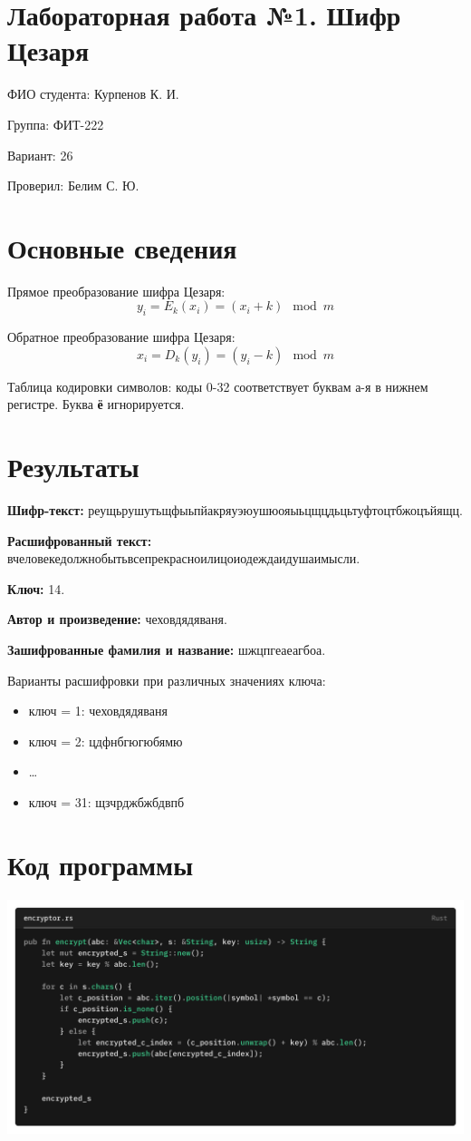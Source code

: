 \documentclass[a4paper]{report}
\begin{document}
\section*{Лабораторная работа №1. Шифр Цезаря}

ФИО студента: Курпенов К. И.

Группа: ФИТ-222

Вариант: 26

Проверил: Белим С. Ю.

\section*{Основные сведения}

Прямое преобразование шифра Цезаря: $$y_i = E_k(x_i) = (x_i + k)\mod{m}$$

Обратное преобразование шифра Цезаря: $$x_i = D_k(y_i) = (y_i - k)\mod{m}$$

Таблица кодировки символов: коды 0-32 соответствует буквам а-я в нижнем регистре.
Буква \textbf{ё} игнорируется.

\section*{Результаты}

\textbf{Шифр-текст:}
реущьрушутьщфыьпйакряуэюушюояыьцщцдьцьтуфтоцтбжоцъйящц.

\textbf{Расшифрованный текст:}
вчеловекедолжнобытьвсепрекрасноилицоиодеждаидушаимысли.

\textbf{Ключ:} 14.

\textbf{Автор и произведение:} чеховдядяваня.

\textbf{Зашифрованные фамилия и название:} шжцпгеаеагбоа.

Варианты расшифровки при различных значениях ключа:
\begin{itemize}
  \item ключ = 1: чеховдядяваня
  \item ключ = 2: цдфнбгюгюбямю
  \item \ldots
  \item ключ = 31: щзчрджбжбдвпб
\end{itemize}

\section*{Код программы}

\includegraphics[width=1\textwidth]{images/caesars_cipher_encryptor.png}
\end{document}
